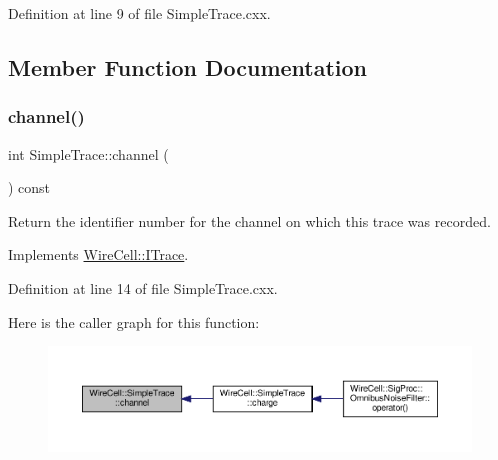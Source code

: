 Definition at line 9 of file Simple\+Trace.\+cxx.



\subsection{Member Function Documentation}
\mbox{\label{class_wire_cell_1_1_simple_trace_ab88d78ce49eb45b395fb5411905ae010}} 
\subsubsection{\texorpdfstring{channel()}{channel()}}
{\footnotesize\ttfamily int Simple\+Trace\+::channel (\begin{DoxyParamCaption}{ }\end{DoxyParamCaption}) const\hspace{0.3cm}{\ttfamily [virtual]}}

Return the identifier number for the channel on which this trace was recorded. 

Implements \hyperlink{class_wire_cell_1_1_i_trace_ae5903cdd197baf3b0ea67d80685851cb}{Wire\+Cell\+::\+I\+Trace}.



Definition at line 14 of file Simple\+Trace.\+cxx.

Here is the caller graph for this function\+:
\nopagebreak
\begin{figure}[H]
\begin{center}
\leavevmode
\includegraphics[width=350pt]{class_wire_cell_1_1_simple_trace_ab88d78ce49eb45b395fb5411905ae010_icgraph}
\end{center}
\end{figure}
\mbox{\label{class_wire_cell_1_1_simple_trace_a2f7bafeb7ae30fa16c72d3c8ae0b64a6}} 
